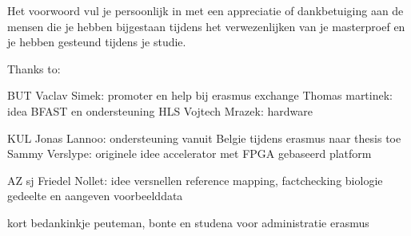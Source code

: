 Het voorwoord vul je persoonlijk in met een appreciatie of dankbetuiging aan de mensen die je hebben bijgestaan tijdens het verwezenlijken van je masterproef en je hebben gesteund tijdens je studie.

Thanks to:

BUT
 Vaclav Simek: promoter en help bij erasmus exchange
 Thomas martinek: idea BFAST en ondersteuning HLS
 Vojtech Mrazek: hardware

KUL
 Jonas Lannoo: ondersteuning vanuit Belgie tijdens erasmus naar thesis toe
 Sammy Verslype: originele idee accelerator met FPGA gebaseerd platform
 
AZ sj
 Friedel Nollet: idee versnellen reference mapping, factchecking biologie gedeelte en aangeven voorbeelddata


kort bedankinkje peuteman, bonte en studena voor administratie erasmus